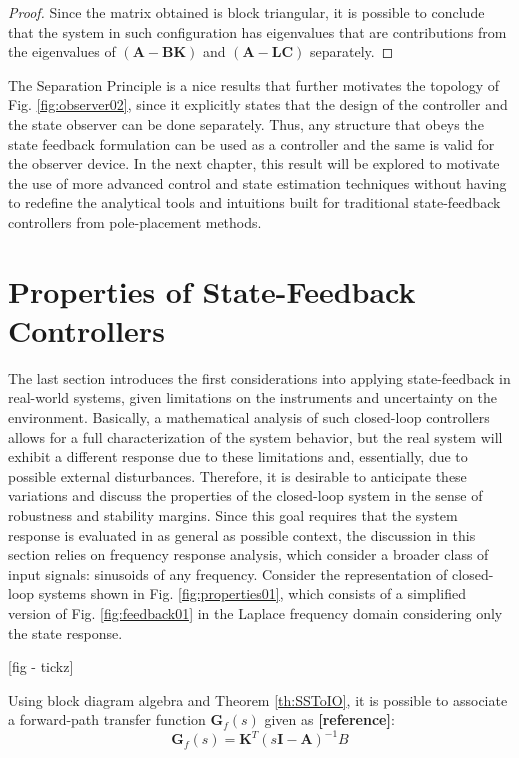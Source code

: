 \documentclass[a4paper,11pt]{book}
\numberwithin{figure}{chapter}
\numberwithin{equation}{chapter}
\numberwithin{table}{chapter}
\theoremstyle{definition}
\begin{document}
\begin{proof}
Since the matrix obtained is block triangular, it is possible to conclude that the system in such configuration has eigenvalues that are contributions from the eigenvalues of $\left( \bm{A} - \bm{B} \bm{K} \right)$ and $\left( \bm{A} - \bm{L} \bm{C} \right)$ separately.
\end{proof}

The Separation Principle is a nice results that further motivates the topology of Fig. \ref{fig:observer02}, since it explicitly states that the design of the controller and the state observer can be done separately. Thus, any structure that obeys the state feedback formulation can be used as a controller and the same is valid for the observer device. In the next chapter, this result will be explored to motivate the use of more advanced control and state estimation techniques without having to redefine the analytical tools and intuitions built for traditional state-feedback controllers from pole-placement methods.

\section{Properties of State-Feedback Controllers}

The last section introduces the first considerations into applying state-feedback in real-world systems, given limitations on the instruments and uncertainty on the environment. Basically, a mathematical analysis of such closed-loop controllers allows for a full characterization of the system behavior, but the real system will exhibit a different response due to these limitations and, essentially, due to possible external disturbances. Therefore, it is desirable to anticipate these variations and discuss the properties of the closed-loop system in the sense of robustness and stability margins. Since this goal requires that the system response is evaluated in as general as possible context, the discussion in this section relies on frequency response analysis, which consider a broader class of input signals: sinusoids of any frequency. Consider the representation of closed-loop systems shown in Fig. \ref{fig:properties01}, which consists of a simplified version of Fig. \ref{fig:feedback01} in the Laplace frequency domain considering only the state response.

[fig - tickz]

Using block diagram algebra and Theorem \ref{th:SSToIO}, it is possible to associate a forward-path transfer function $\bm{G}_{f}(s)$ given as \textbf{[reference]}:
\begin{equation} \label{eq:fdbckForwardTrnsfer}
	\bm{G}_{f}(s) =  \bm{K}^{T} \left(s \bm{I} - \bm{A} \right)^{-1} B 
\end{equation}
\end{document}
